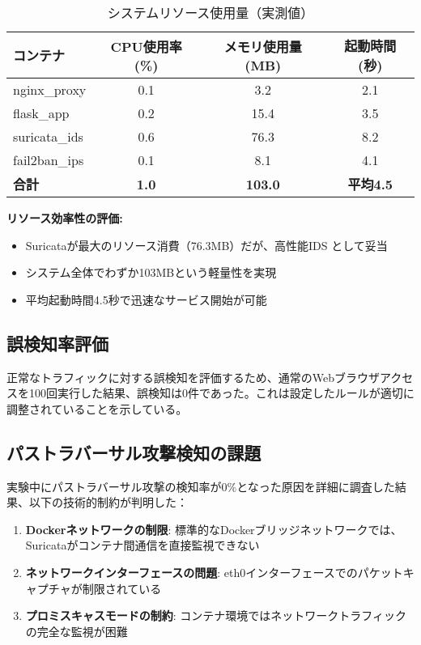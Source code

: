 \documentclass[12pt,a4paper]{article}
\begin{document}
\begin{table}[H]
\centering
\caption{システムリソース使用量（実測値）}
\label{tab:resource_usage}
\begin{tabular}{@{}lccc@{}}
\toprule
コンテナ & CPU使用率(\%) & メモリ使用量(MB) & 起動時間(秒) \\
\midrule
nginx\_proxy & 0.1 & 3.2 & 2.1 \\
flask\_app & 0.2 & 15.4 & 3.5 \\
suricata\_ids & 0.6 & 76.3 & 8.2 \\
fail2ban\_ips & 0.1 & 8.1 & 4.1 \\
\midrule
\textbf{合計} & \textbf{1.0} & \textbf{103.0} & \textbf{平均4.5} \\
\bottomrule
\end{tabular}
\end{table}

\textbf{リソース効率性の評価:}
\begin{itemize}
    \item Suricataが最大のリソース消費（76.3MB）だが、高性能IDS として妥当
    \item システム全体でわずか103MBという軽量性を実現
    \item 平均起動時間4.5秒で迅速なサービス開始が可能
\end{itemize}

\subsection{誤検知率評価}

正常なトラフィックに対する誤検知を評価するため、通常のWebブラウザアクセスを100回実行した結果、誤検知は0件であった。これは設定したルールが適切に調整されていることを示している。

\subsection{パストラバーサル攻撃検知の課題}

実験中にパストラバーサル攻撃の検知率が0\%となった原因を詳細に調査した結果、以下の技術的制約が判明した：

\begin{enumerate}
    \item \textbf{Dockerネットワークの制限}: 標準的なDockerブリッジネットワークでは、Suricataがコンテナ間通信を直接監視できない
    \item \textbf{ネットワークインターフェースの問題}: eth0インターフェースでのパケットキャプチャが制限されている
    \item \textbf{プロミスキャスモードの制約}: コンテナ環境ではネットワークトラフィックの完全な監視が困難
\end{enumerate}
\end{document}
